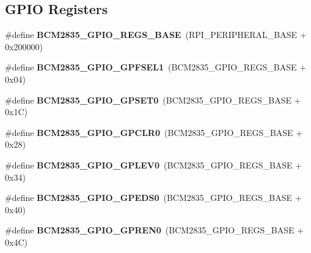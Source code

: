 \subsection*{G\+P\+IO Registers}
\begin{DoxyCompactItemize}
\item 
\mbox{\label{group__raspberrypi__reg_ga97d733601c2b9d840d0c0c7fedf5ef56}} 
\#define {\bfseries B\+C\+M2835\+\_\+\+G\+P\+I\+O\+\_\+\+R\+E\+G\+S\+\_\+\+B\+A\+SE}~(R\+P\+I\+\_\+\+P\+E\+R\+I\+P\+H\+E\+R\+A\+L\+\_\+\+B\+A\+SE + 0x200000)
\item 
\mbox{\label{group__raspberrypi__reg_ga9ec439bf3482633f7597215ba559b81d}} 
\#define {\bfseries B\+C\+M2835\+\_\+\+G\+P\+I\+O\+\_\+\+G\+P\+F\+S\+E\+L1}~(B\+C\+M2835\+\_\+\+G\+P\+I\+O\+\_\+\+R\+E\+G\+S\+\_\+\+B\+A\+SE + 0x04)
\item 
\mbox{\label{group__raspberrypi__reg_ga209677b7e56b142705de5c88555c25f8}} 
\#define {\bfseries B\+C\+M2835\+\_\+\+G\+P\+I\+O\+\_\+\+G\+P\+S\+E\+T0}~(B\+C\+M2835\+\_\+\+G\+P\+I\+O\+\_\+\+R\+E\+G\+S\+\_\+\+B\+A\+SE + 0x1\+C)
\item 
\mbox{\label{group__raspberrypi__reg_ga6bb5294829d6ac599a038188bc5859a5}} 
\#define {\bfseries B\+C\+M2835\+\_\+\+G\+P\+I\+O\+\_\+\+G\+P\+C\+L\+R0}~(B\+C\+M2835\+\_\+\+G\+P\+I\+O\+\_\+\+R\+E\+G\+S\+\_\+\+B\+A\+SE + 0x28)
\item 
\mbox{\label{group__raspberrypi__reg_ga72a78e41921224af69c9ceecf108147f}} 
\#define {\bfseries B\+C\+M2835\+\_\+\+G\+P\+I\+O\+\_\+\+G\+P\+L\+E\+V0}~(B\+C\+M2835\+\_\+\+G\+P\+I\+O\+\_\+\+R\+E\+G\+S\+\_\+\+B\+A\+SE + 0x34)
\item 
\mbox{\label{group__raspberrypi__reg_ga0745b73e8124b6d08efee0a620111c12}} 
\#define {\bfseries B\+C\+M2835\+\_\+\+G\+P\+I\+O\+\_\+\+G\+P\+E\+D\+S0}~(B\+C\+M2835\+\_\+\+G\+P\+I\+O\+\_\+\+R\+E\+G\+S\+\_\+\+B\+A\+SE + 0x40)
\item 
\mbox{\label{group__raspberrypi__reg_ga39935790bf3ea050029afc0505715d99}} 
\#define {\bfseries B\+C\+M2835\+\_\+\+G\+P\+I\+O\+\_\+\+G\+P\+R\+E\+N0}~(B\+C\+M2835\+\_\+\+G\+P\+I\+O\+\_\+\+R\+E\+G\+S\+\_\+\+B\+A\+SE + 0x4\+C)

\end{DoxyCompactItemize}
